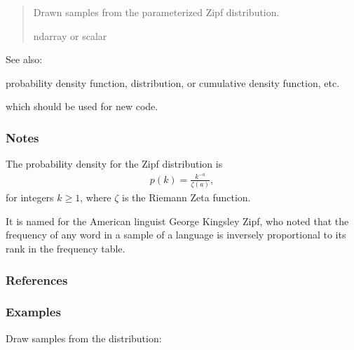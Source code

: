 \documentclass[letterpaper,10pt,english]{sphinxmanual}
\begin{document}
\begin{fulllineitems}
\begin{quote}
\begin{description}
\begin{itemize}
\end{itemize}

\sphinxAtStartPar
{} \textendash{} Drawn samples from the parameterized Zipf distribution.

\sphinxAtStartPar
ndarray or scalar

\end{description}\end{quote}


\begin{sphinxseealso}{See also:}
\begin{description}
\sphinxAtStartPar
probability density function, distribution, or cumulative density function, etc.

\sphinxAtStartPar
which should be used for new code.

\end{description}


\end{sphinxseealso}

\subsubsection*{Notes}

\sphinxAtStartPar
The probability density for the Zipf distribution is
\begin{equation*}
\begin{split}p(k) = \frac{k^{-a}}{\zeta(a)},\end{split}
\end{equation*}
\sphinxAtStartPar
for integers \(k \geq 1\), where \(\zeta\) is the Riemann Zeta
function.

\sphinxAtStartPar
It is named for the American linguist George Kingsley Zipf, who noted
that the frequency of any word in a sample of a language is inversely
proportional to its rank in the frequency table.
\subsubsection*{References}
\subsubsection*{Examples}

\sphinxAtStartPar
Draw samples from the distribution:


\end{fulllineitems}
\end{document}

